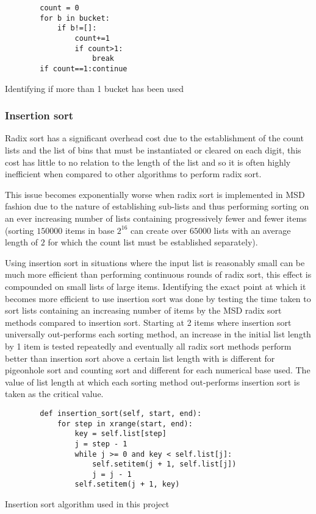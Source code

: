 \documentclass[12pt]{article}
\begin{document}
\begin{table}[H]
	\centering
	\begin{lstlisting}
		count = 0
		for b in bucket:
			if b!=[]:
				count+=1
				if count>1:
					break
		if count==1:continue
	\end{lstlisting}
	\caption*{Identifying if more than 1 bucket has been used}
\end{table}


\subsubsection{Insertion sort}
\label{sssec:insertionoptimization}
Radix sort has a significant overhead cost due to the establishment of the count lists and the list of bins that must be instantiated or cleared on each digit, this cost has little to no relation to the length of the list and so it is often highly inefficient when compared to other algorithms to perform radix sort.
\par
This issue becomes exponentially worse when radix sort is implemented in MSD fashion due to the nature of establishing sub-lists and thus performing sorting on an ever increasing number of lists containing progressively fewer and fewer items (sorting $150000$ items in base $2^{16}$ can create over $65000$ lists with an average length of $2$ for which the count list must be established separately).
\par
Using insertion sort in situations where the input list is reasonably small can be much more efficient than performing continuous rounds of radix sort, this effect is compounded on small lists of large items. Identifying the exact point at which it becomes more efficient to use insertion sort was done by testing the time taken to sort lists containing an increasing number of items by the MSD radix sort methods compared to insertion sort. Starting at 2 items where insertion sort universally out-performs each sorting method, an increase in the initial list length by 1 item is tested repeatedly and eventually all radix sort methods perform better than insertion sort above a certain list length with is different for pigeonhole sort and counting sort and different for each numerical base used. The value of list length at which each sorting method out-performs insertion sort is taken as the critical value. 
\begin{table}[H]
	\centering
	\begin{lstlisting}
        def insertion_sort(self, start, end):
            for step in xrange(start, end):
                key = self.list[step]
                j = step - 1
                while j >= 0 and key < self.list[j]:
                    self.setitem(j + 1, self.list[j])
                    j = j - 1
                self.setitem(j + 1, key)
	\end{lstlisting}
	\caption*{Insertion sort algorithm used in this project}
\end{table}
\end{document}
